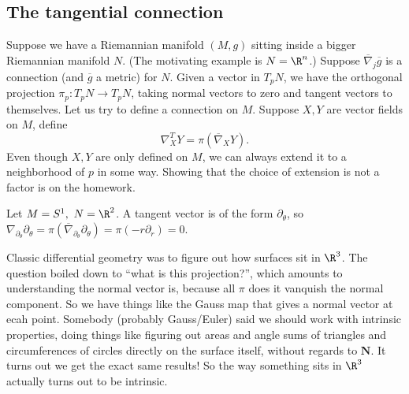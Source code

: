 \subsection{The tangential connection}
Suppose we have a Riemannian manifold $(M,g)$ sitting inside a bigger Riemannian manifold $N$. (The motivating example is $N=\R^n $.) Suppose $\overline{\nabla}_j \overline{g}$ is a connection (and $\overline{g}$ a metric) for $N$. Given a vector in $T_p N$, we have the orthogonal projection $\pi_p \colon T_p N \to T_p N$, taking normal vectors to zero and tangent vectors to themselves. Let us try to define a connection on $M$. Suppose $X,Y$ are vector fields on $M$, define \[
    \nabla_X^T Y=\pi\left( \overline{\nabla}_XY \right) .
\] Even though $X,Y$ are only defined on $M$, we can always extend it to a neighborhood of $p$ in some way. Showing that the choice of extension is not a factor is on the homework.
\begin{example}
    Let $M=S^1 ,\ N=\R^2$. A tangent vector is of the form $\partial _{\theta}$, so $\nabla _{\partial _{\theta}}\partial _{\theta}=\pi\left(\overline{\nabla}_{\partial _{\theta}}\partial _{\theta}\right)=\pi(-r \partial _r)=0$.
\end{example}
Classic differential geometry was to figure out how surfaces sit in $\R^3$. The question boiled down to ``what is this projection?'', which amounts to understanding the normal vector is, because all $\pi$ does it vanquish the normal component. So we have things like the Gauss map that gives a normal vector at ecah point. Somebody (probably Gauss/Euler) said we should work with intrinsic properties, doing things like figuring out areas and angle sums of triangles and circumferences of circles directly on the surface itself, without regards to $\mathbf N$. It turns out we get the exact same results! So the way something sits in $\R^3$ actually turns out to be intrinsic.
